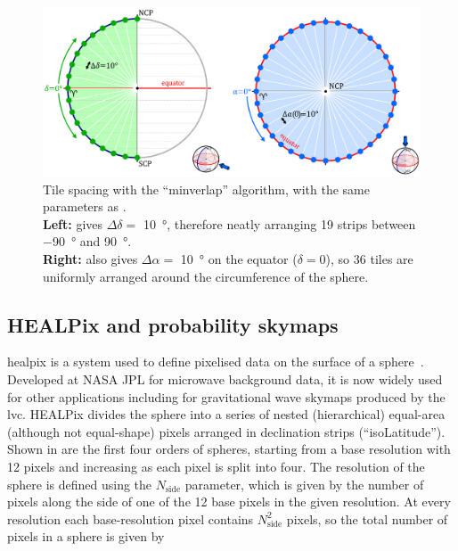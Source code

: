 \begin{colsection}
\begin{colsection}
\begin{figure}[p]
\begin{center}
\includegraphics[width=\linewidth]{images/spacing_minverlap.pdf}
\end{center}
\caption[Tile spacing with the ``minverlap'' algorithm]{Tile spacing with the ``minverlap'' algorithm, with the same parameters as .
\\
\textbf{Left:}  gives $\Delta\delta = $ \SI{10}{\degree}, therefore neatly arranging 19 strips between \SI{-90}{\degree} and \SI{90}{\degree}.
\\
\textbf{Right:}  also gives $\Delta\alpha = $ \SI{10}{\degree} on the equator ($\delta=0$), so 36 tiles are uniformly arranged around the circumference of the sphere.
}
\label{fig:minverlap_spacing}
\end{figure}

\newpage

\end{colsection}


\subsection{HEALPix and probability skymaps}
\label{sec:skymaps}
\begin{colsection}

\gls{healpix} is a system used to define pixelised data on the surface of a sphere~\citep{HEALPix}. Developed at NASA JPL for microwave background data, it is now widely used for other applications including for gravitational wave skymaps produced by the \gls{lvc}. HEALPix divides the sphere into a series of nested (hierarchical) equal-area (although not equal-shape) pixels arranged in declination strips (``isoLatitude''). Shown in  are the first four orders of spheres, starting from a base resolution with 12 pixels and increasing as each pixel is split into four. The resolution of the sphere is defined using the $N_\text{side}$ parameter, which is given by the number of pixels along the side of one of the 12 base pixels in the given resolution. At every resolution each base-resolution pixel contains $N_\text{side}^2$ pixels, so the total number of pixels in a sphere is given by


\end{colsection}
\end{colsection}
